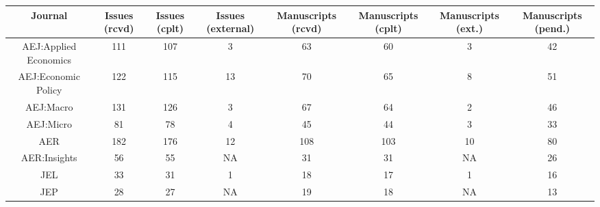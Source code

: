 
\begin{tabular}{@{\extracolsep{5pt}} cccccccc} 
\toprule 
Journal & Issues (rcvd) & Issues (cplt) & Issues (external) & Manuscripts (rcvd) & Manuscripts (cplt) & Manuscripts (ext.) & Manuscripts (pend.) \\ 
\midrule AEJ:Applied Economics & 111 & 107 & 3 & 63 & 60 & 3 & 42 \\ 
AEJ:Economic Policy & 122 & 115 & 13 & 70 & 65 & 8 & 51 \\ 
AEJ:Macro & 131 & 126 & 3 & 67 & 64 & 2 & 46 \\ 
AEJ:Micro & 81 & 78 & 4 & 45 & 44 & 3 & 33 \\ 
AER & 182 & 176 & 12 & 108 & 103 & 10 & 80 \\ 
AER:Insights & 56 & 55 & NA & 31 & 31 & NA & 26 \\ 
JEL & 33 & 31 & 1 & 18 & 17 & 1 & 16 \\ 
JEP & 28 & 27 & NA & 19 & 18 & NA & 13 \\ 
\bottomrule 
\end{tabular} 
